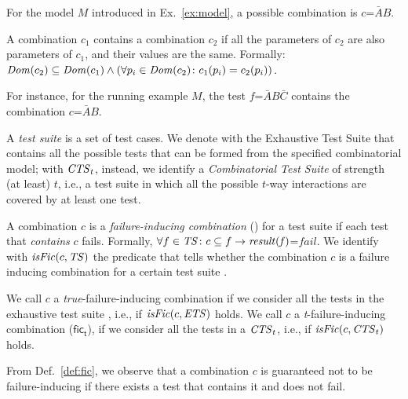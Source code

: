\begin{tikzborder}{\cite{Gargantini16:validation}}
\begin{tikzborder}{\cite{gargantini_combinatorial_2017}}
\begin{tikzborder}{\cite{garn2019}}
\begin{tikzborder}{\cite{arcaini2019achieving}}
\begin{tikzborder}{}
\begin{example}
	For the model $M$ introduced in Ex.~\ref{ex:model}, a possible combination is $c$=$\bar{A}B$.
\end{example}

\begin{defn}\label{def:combContainment}
	A combination $c_1$ contains a combination $c_2$ if all the parameters of $c_2$ are also parameters of $c_1$, and their values are the same. Formally: $\mathit{Dom}(c_2) \subseteq \mathit{Dom}(c_1) \wedge (\forall p_i \in \mathit{Dom}(c_2) \colon c_1(p_i) = c_2(p_i))$.
\end{defn}

\begin{example}
	For instance, for the running example $M$, the test $f$=$\bar{A}B\bar{C}$ contains the combination $c$=$\bar{A}B$.
\end{example}

\begin{defn}
	A {\it test suite} \ts is a set of test cases. We denote with \ets the Exhaustive Test Suite that contains all the possible tests that can be formed from the specified combinatorial model; with $\mathit{CTS}_t$, instead, we identify a {\it Combinatorial Test Suite} of strength (at least) $t$, i.e., a test suite in which all the possible $t$-way interactions are covered by at least one test.
\end{defn}

\begin{defn}\label{def:fic}
	A combination $c$ is a {\it failure-inducing combination} (\fic) for a test suite \ts if each test that \emph{contains} $c$ fails. Formally, $\forall f \in \mathit{TS} \colon c \subseteq f \rightarrow \mathit{\mathit{result}(f)}$=$\textit{fail}$. We identify with $\mathit{isFic}(c,\mathit{TS})$ the predicate that tells whether the combination $c$ is a failure inducing combination for a certain test suite \ts.
	
	We call $c$ a \textit{true}-failure-inducing combination if we consider all the tests in the exhaustive test suite \ets, i.e., if $\mathit{isFic}(c, \mathit{ETS})$ holds. We call $c$ a \textit{t}-failure-inducing combination ($\mathsf{fic_t}$), if we consider all the tests in a $\mathit{CTS}_t$, i.e., if $\mathit{isFic}(c, \mathit{CTS}_t)$ holds.
\end{defn}

\begin{observation}\label{obs:notFailureInd}
	From Def.~\ref{def:fic}, we observe that a combination $c$ is guaranteed not to be failure-inducing if there exists a test that contains it and does not fail.
\end{observation}
\end{tikzborder}


\end{tikzborder}
\end{tikzborder}
\end{tikzborder}
\end{tikzborder}
